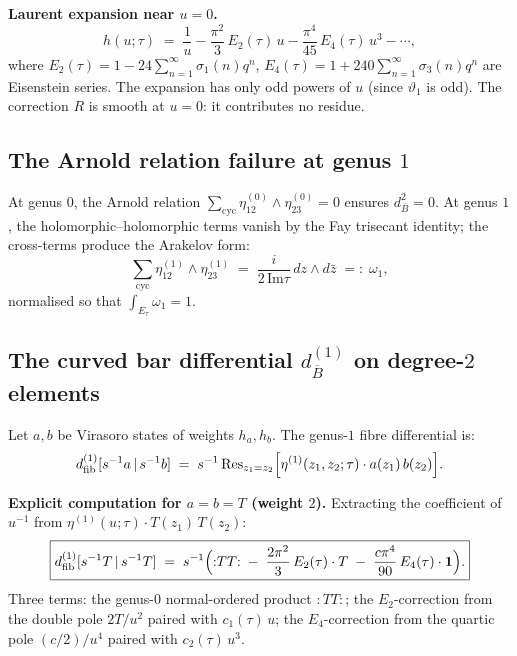 \documentclass[11pt]{article}
\newcommand{\barB}{\overline{B}}
\newcommand{\dfib}{d_{\mathrm{fib}}}
\begin{document}
\noindent
\textbf{Laurent expansion near $u = 0$.}
\begin{equation}\label{eq:wn-laurent}
h(u;\tau)
\;=\;
\frac{1}{u}
- \frac{\pi^2}{3}\,E_2(\tau)\,u
- \frac{\pi^4}{45}\,E_4(\tau)\,u^3
- \cdots,
\end{equation}
where $E_2(\tau) = 1 - 24\sum_{n=1}^\infty \sigma_1(n)q^n$,
$E_4(\tau) = 1 + 240\sum_{n=1}^\infty \sigma_3(n)q^n$ are
Eisenstein series.  The expansion has only odd powers of $u$
(since $\vartheta_1$ is odd).  The correction $R$ is smooth at
$u = 0$: it contributes no residue.

\subsection{The Arnold relation failure at genus $1$}
\label{subsec:wn-arnold-failure}

At genus $0$, the Arnold relation
$\sum_{\mathrm{cyc}}\eta^{(0)}_{12}\wedge\eta^{(0)}_{23} = 0$
ensures $d_{\barB}^2 = 0$.  At genus $1$, the
holomorphic--holomorphic terms vanish by the Fay trisecant
identity; the cross-terms produce the Arakelov form:
\begin{equation}\label{eq:wn-arnold-defect}
\boxed{
\sum_{\mathrm{cyc}}
\eta^{(1)}_{12} \wedge \eta^{(1)}_{23}
\;=\;
\frac{i}{2\,\mathrm{Im}\tau}\,dz \wedge d\bar{z}
\;=:\; \omega_1,
}
\end{equation}
normalised so that $\int_{E_\tau}\omega_1 = 1$.

\subsection{The curved bar differential $d_{\barB}^{(1)}$ on
  degree-$2$ elements}
\label{subsec:wn-curved-differential}

Let $a, b$ be Virasoro states of weights $h_a, h_b$.
The genus-$1$ fibre differential is:
\begin{equation}\label{eq:wn-dfib-genus1}
\dfib^{(1)}[s^{-1}a \,|\, s^{-1}b]
\;=\;
s^{-1}\operatorname{Res}_{z_1 = z_2}\Bigl[
  \eta^{(1)}(z_1, z_2;\tau) \cdot a(z_1)\,b(z_2)
\Bigr].
\end{equation}

\noindent\textbf{Explicit computation for $a = b = T$ (weight $2$).}
Extracting the coefficient of $u^{-1}$ from
$\eta^{(1)}(u;\tau)\cdot T(z_1)\,T(z_2)$:
\begin{equation}\label{eq:wn-dfib-TT}
\boxed{
\dfib^{(1)}[s^{-1}T \,|\, s^{-1}T]
\;=\;
s^{-1}\Bigl(
  {:}TT{:}
  \;-\; \frac{2\pi^2}{3}\,E_2(\tau)\cdot T
  \;-\; \frac{c\pi^4}{90}\,E_4(\tau)\cdot \mathbf{1}
\Bigr).
}
\end{equation}
Three terms: the genus-$0$ normal-ordered product ${:}TT{:}$;
the $E_2$-correction from the double pole $2T/u^2$ paired with
$c_1(\tau)\,u$; the $E_4$-correction from the quartic pole
$(c/2)/u^4$ paired with $c_2(\tau)\,u^3$.
\end{document}
